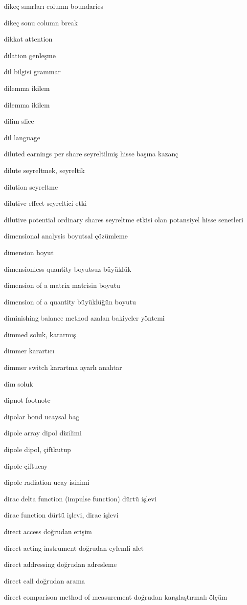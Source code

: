 \documentclass[12pt,fleqn]{article}\usepackage{../../common}
\begin{document}
dikeç sınırları column boundaries

dikeç sonu column break

dikkat attention

dilation genleşme

dil bilgisi grammar

dilemma ikilem

dilemma ikilem

dilim slice

dil language

diluted earnings per share seyreltilmiş hisse başına kazanç

dilute seyreltmek, seyreltik

dilution seyreltme

dilutive effect seyreltici etki

dilutive potential ordinary shares seyreltme etkisi olan potansiyel hisse senetleri

dimensional analysis boyutsal çözümleme

dimension boyut

dimensionless quantity boyutsuz büyüklük

dimension of a matrix matrisin boyutu

dimension of a quantity büyüklüğün boyutu

diminishing balance method azalan bakiyeler yöntemi

dimmed soluk, kararmış

dimmer karartıcı

dimmer switch karartma ayarlı anahtar

dim soluk

dipnot footnote

dipolar bond ucaysal bag

dipole array dipol dizilimi

dipole dipol, çiftkutup

dipole çiftucay

dipole radiation ucay isinimi

dirac delta function (impulse function) dürtü işlevi

dirac function dürtü işlevi, dirac işlevi

direct access doğrudan erişim

direct acting instrument doğrudan eylemli alet

direct addressing doğrudan adresleme

direct call doğrudan arama

direct comparison method of measurement doğrudan karşılaştırmalı ölçüm
\end{document}
